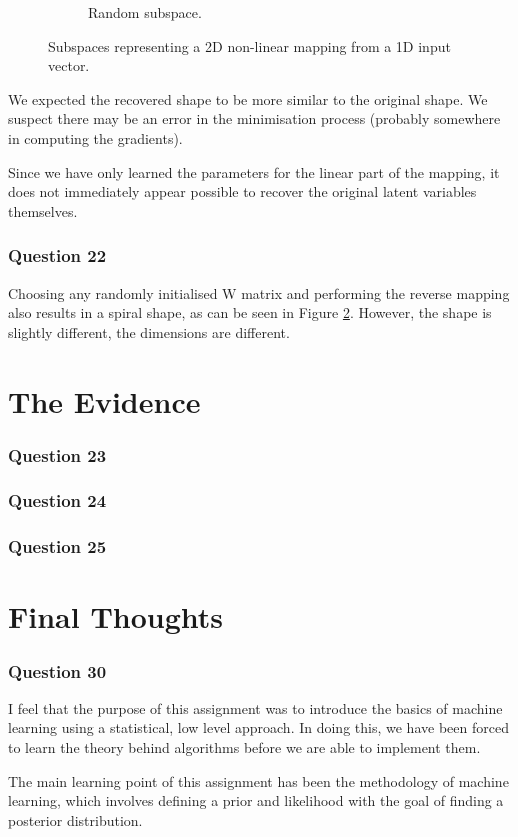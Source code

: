 \documentclass[10pt, a4paper, twocolumn]{article} %
\begin{document}
\begin{figure}[!htb]
\begin{subfigure}{.5\linewidth}
  \caption{Random subspace.}
  \label{fig:q22}
\end{subfigure}
\caption{Subspaces representing a 2D non-linear mapping from a 1D input vector. }
\end{figure}

We expected the recovered shape to be more similar to the original shape. We suspect there may be an error in the minimisation process (probably somewhere in computing the gradients).

Since we have only learned the parameters for the linear part of the mapping, it does not immediately appear possible to recover the original latent variables themselves.

\subsubsection*{Question 22}

Choosing any randomly initialised W matrix and performing the reverse mapping also results in a spiral shape, as can be seen in Figure \ref{fig:q22}. However, the shape is slightly different, the dimensions are different.


\section{The Evidence}

\subsubsection*{Question 23}

\subsubsection*{Question 24}

\subsubsection*{Question 25}

\section{Final Thoughts}
\subsubsection*{Question 30}
I feel that the purpose of this assignment was to introduce the basics of machine learning using a statistical, low level approach. In doing this, we have been forced to learn the theory behind algorithms before we are able to implement them. 
\par
The main learning point of this assignment has been the methodology of machine learning, which involves defining a prior and likelihood with the goal of finding a posterior distribution. 
\end{document}
